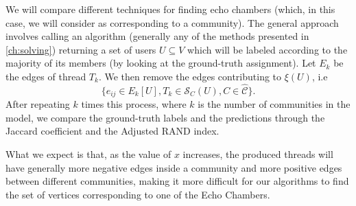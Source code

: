 We will compare different techniques for finding echo chambers (which,
in this case, we will consider as corresponding to a community). The general
approach involves calling an algorithm (generally any of the methods presented
in \autoref{ch:solving}) returning a set of users $U \subseteq V$ which will be
labeled according to the majority of its members (by looking at the
ground-truth assignment).
Let $E_k$ be the edges of thread $T_k$. We then remove the edges contributing to $\xi(U)$, i.e\
\begin{equation*}
	\{ e_{ij} \in E_k[U], T_k \in \mathcal{S}_{C}(U), C \in \mathcal{\hat{C}}
	\}.
\end{equation*}
After repeating $k$ times this process, where $k$ is the number
of communities in the model, we compare the ground-truth labels and the
predictions through the Jaccard coefficient and the Adjusted RAND
index\footnotemark.


What we expect is that, as the value of $x$ increases, the produced threads
will have generally more negative edges inside a community and more positive
edges between different communities, making it more difficult for our
algorithms to find the set of vertices corresponding to one of the Echo
Chambers.

